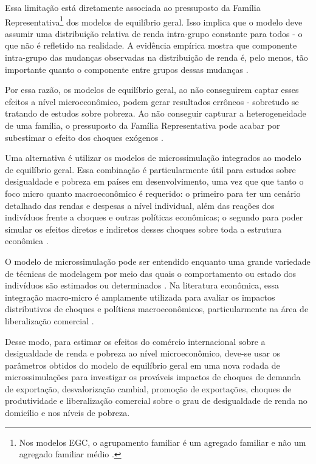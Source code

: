 Essa limitação está diretamente associada ao pressuposto da Família Representativa\footnote{Nos modelos EGC, o agrupamento familiar é um agregado familiar e não um agregado familiar médio \cite{tiberti17}.} dos modelos de equilíbrio geral. Isso implica que o modelo deve assumir uma distribuição relativa de renda intra-grupo constante para todos - o que não é refletido na realidade. A evidência empírica mostra que componente intra-grupo das mudanças observadas na distribuição de renda é, pelo menos, tão importante quanto o componente entre grupos dessas mudanças \cite{colombo08}.

Por essa razão, os modelos de equilíbrio geral, ao não conseguirem captar esses efeitos a nível microeconômico, podem gerar resultados errôneos - sobretudo se tratando de estudos sobre pobreza. Ao não conseguir capturar a heterogeneidade de uma família, o pressuposto da Família Representativa pode acabar por subestimar o efeito dos choques exógenos \cite{colombo08}. 

Uma alternativa é utilizar os modelos de microssimulação integrados ao modelo de equilíbrio geral. Essa combinação é particularmente útil para estudos sobre desigualdade e pobreza em países em desenvolvimento, uma vez que que tanto o foco micro quanto macroeconômico é requerido: o primeiro para ter um cenário detalhado das rendas e despesas a nível individual, além das reações dos indivíduos frente a choques e outras políticas econômicas; o segundo para poder simular os efeitos diretos e indiretos desses choques sobre toda a estrutura econômica \cite{tiberti17, klevmarken22}.

O modelo de microssimulação pode ser entendido enquanto uma grande variedade de técnicas de modelagem por meio das quais o comportamento ou estado dos indivíduos são estimados ou determinados \cite{figari15}. Na literatura econômica, essa integração macro-micro é amplamente utilizada para avaliar os impactos distributivos de choques e políticas macroeconômicos, particularmente
na área de liberalização comercial \cite{carneiro06, ferreira06, raihan10, cicowiez16, mbanda21}.

Desse modo, para estimar os efeitos do comércio internacional sobre a desigualdade de renda e pobreza ao nível microeconômico, deve-se usar os parâmetros obtidos do modelo de equilíbrio geral em uma nova rodada de microssimulações para investigar os prováveis impactos de choques de demanda de exportação, desvalorização cambial, promoção de exportações, choques de produtividade e liberalização comercial sobre o grau de desigualdade de renda no domicílio e nos níveis de pobreza.

